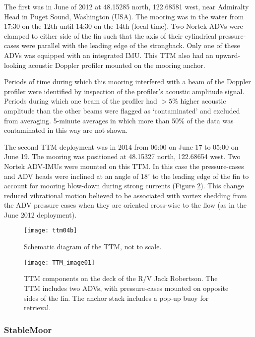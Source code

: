 The first was in June of 2012 at 48.15285 north, 122.68581 west, near Admiralty Head in Puget Sound, Washington (USA). The mooring was in the water from 17:30 on the 12th until 14:30 on the 14th (local time). Two Nortek ADVs were clamped to either side of the fin such that the axis of their cylindrical pressure-cases were parallel with the leading edge of the strongback. Only one of these ADVs was equipped with an integrated IMU. This TTM also had an upward-looking acoustic Doppler profiler mounted on the mooring anchor.

Periods of time during which this mooring interfered with a beam of the Doppler profiler were identified by inspection of the profiler's acoustic amplitude signal. Periods during which one beam of the profiler had $>5\%$ higher acoustic amplitude than the other beams were flagged as `contaminated' and excluded from averaging.  5-minute averages in which more than 50\% of the data was contaminated in this way are not shown.

The second TTM deployment was in 2014 from 06:00 on June 17 to 05:00 on June 19. The mooring was positioned at 48.15327 north, 122.68654 west.  Two Nortek ADV-IMUs were mounted on this TTM. In this case the pressure-cases and ADV heads were inclined at an angle of 18$^\circ$ to the leading edge of the fin to account for mooring blow-down during strong currents (Figure \ref{fig:ttm:photo}). This change reduced vibrational motion believed to be associated with vortex shedding from the ADV pressure cases when they are oriented cross-wise to the flow (as in the June 2012 deployment).

\begin{figure}[t]
  \centering
  \texttt{[image: ttm04b]}
  \caption{Schematic diagram of the TTM, not to scale.}
  \label{fig:ttm:diagram}
\end{figure}

\begin{figure}[t]
  \centering
  \texttt{[image: TTM\_image01]}  
  \caption{TTM components on the deck of the R/V Jack Robertson. The TTM includes two ADVs, with pressure-cases mounted on opposite sides of the fin. The anchor stack includes a pop-up buoy for retrieval. }
  \label{fig:ttm:photo}
\end{figure}

\subsubsection{StableMoor}

